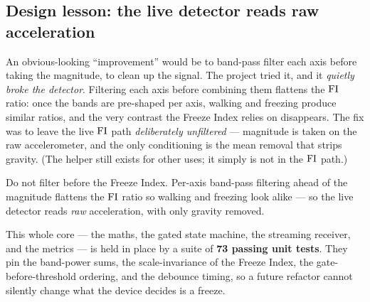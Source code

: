 \subsection{Design lesson: the live detector reads raw acceleration}

An obvious-looking ``improvement'' would be to band-pass filter each axis before
taking the magnitude, to clean up the signal. The project tried it, and it
\emph{quietly broke the detector}. Filtering each axis before combining them flattens
the $\mathrm{FI}$ ratio: once the bands are pre-shaped per axis, walking and freezing produce
similar ratios, and the very contrast the Freeze Index relies on disappears. The fix
was to leave the live $\mathrm{FI}$ path \emph{deliberately unfiltered} --- magnitude is taken
on the raw accelerometer, and the only conditioning is the mean removal that strips
gravity. (The  helper still exists for other uses; it simply is not
in the $\mathrm{FI}$ path.)

\begin{takeaway}
Do not filter before the Freeze Index. Per-axis band-pass filtering ahead of the
magnitude flattens the $\mathrm{FI}$ ratio so walking and freezing look alike --- so the live
detector reads \emph{raw} acceleration, with only gravity removed.
\end{takeaway}

This whole core --- the  maths, the gated state machine, the streaming
receiver, and the metrics --- is held in place by a suite of \textbf{73 passing unit
tests}. They pin the band-power sums, the scale-invariance of the Freeze Index, the
gate-before-threshold ordering, and the debounce timing, so a future refactor cannot
silently change what the device decides is a freeze.
